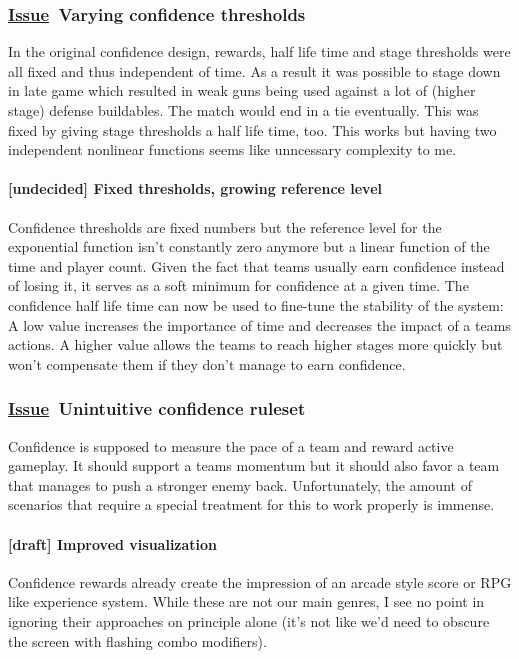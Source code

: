 \documentclass{scrartcl}
\newcommand{\issue}    [0]{\textbf{\underline{Issue}\ }}
\newcommand{\draft}    [0]{\textcolor{draft}    {\textbf{[draft] }}}
\newcommand{\undecided}[0]{\textcolor{undecided}{\textbf{[undecided] }}}
\begin{document}
\subsubsection{\issue Varying confidence thresholds}

In the original confidence design, rewards, half life time and stage thresholds were all fixed and thus independent of time. As a result it was possible to stage down in late game which resulted in weak guns being used against a lot of (higher stage) defense buildables. The match would end in a tie eventually. This was fixed by giving stage thresholds a half life time, too. This works but having two independent nonlinear functions seems like unncessary complexity to me.

\paragraph{\undecided Fixed thresholds, growing reference level}

Confidence thresholds are fixed numbers but the reference level for the exponential function isn't constantly zero anymore but a linear function of the time and player count. Given the fact that teams usually earn confidence instead of losing it, it serves as a soft minimum for confidence at a given time. The confidence half life time can now be used to fine-tune the stability of the system: A low value increases the importance of time and decreases the impact of a teams actions. A higher value allows the teams to reach higher stages more quickly but won't compensate them if they don't manage to earn confidence.

\subsubsection{\issue Unintuitive confidence ruleset}

Confidence is supposed to measure the pace of a team and reward active gameplay. It should support a teams momentum but it should also favor a team that manages to push a stronger enemy back. Unfortunately, the amount of scenarios that require a special treatment for this to work properly is immense.

\paragraph{\draft Improved visualization}

Confidence rewards already create the impression of an arcade style score or RPG like experience system. While these are not our main genres, I see no point in ignoring their approaches on principle alone (it's not like we'd need to obscure the screen with flashing combo modifiers).
\end{document}
